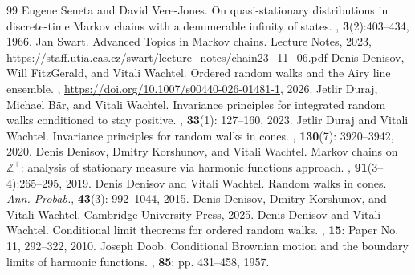 \documentclass[10pt,a4paper]{amsart}
\newcommand{\1}{\mathds{1}}
\begin{document}
\begin{thebibliography}{99}
 Eugene Seneta and David Vere-Jones. \newblock On quasi-stationary distributions in discrete-time {M}arkov chains with a denumerable infinity of states. , {\bf 3}(2):403--434, 1966.
 Jan Swart. \newblock Advanced Topics in Markov chains. Lecture Notes, 2023, \url{https://staff.utia.cas.cz/swart/lecture\_notes/chain23\_11\_06.pdf}
 Denis Denisov, Will FitzGerald, and Vitali Wachtel. \newblock Ordered random walks and the Airy line ensemble. , \url{https://doi.org/10.1007/s00440-026-01481-1}, 2026.
 Jetlir Duraj, Michael B\"ar, and Vitali Wachtel. \newblock Invariance principles for integrated random walks conditioned to stay positive. , {\bf 33}(1): 127--160, 2023.
 Jetlir Duraj and Vitali Wachtel. \newblock Invariance principles for random walks in cones. , {\bf 130}(7): 3920--3942, 2020.
 Denis Denisov, Dmitry Korshunov, and Vitali Wachtel. \newblock Markov chains on $\mathbb{Z}^+$: analysis of stationary measure via harmonic functions approach. , {\bf 91}(3--4):265--295, 2019.
 Denis Denisov and Vitali Wachtel. \newblock Random walks in cones. {\em Ann. Probab.}, {\bf 43}(3): 992--1044, 2015.
 Denis Denisov, Dmitry Korshunov, and Vitali Wachtel.  Cambridge University Press, 2025.
 Denis Denisov and Vitali Wachtel. \newblock Conditional limit theorems for ordered random walks. , {\bf 15}: Paper No. 11, 292--322, 2010.
 Joseph Doob. \newblock Conditional {B}rownian motion and the boundary limits of harmonic functions. , {\bf 85}: pp. 431--458, 1957.
\end{thebibliography}
\end{document}
